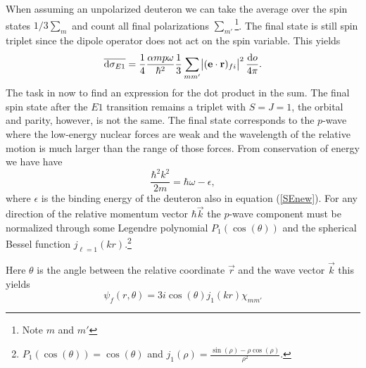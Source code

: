 When assuming an unpolarized deuteron we can take the average over the spin states $1/3 \sum_m$ and count all final polarizations $\sum_{m'}$\footnote{Note $m$ and $m'$}. The final state is still spin triplet since the dipole operator does not act on the spin variable. This yields
\begin{equation} \label{diffcross}
    \overline{\textrm{d}\sigma_{E1}} = \frac{1}{4}\frac{\alpha m p \omega}{\hbar^2} \frac{1}{3} \sum_{mm'}\abs{(\bm{\mathrm{e}}\cdot \bm{\mathrm{r}})_{fi}}^2 \frac{\textrm{d}o}{4\pi}.
\end{equation}
The task in now to find an expression for the dot product in the sum. The final spin state after the $E1$ transition remains a triplet with $S=J=1$, the orbital and parity, however, is not the same. The final state corresponds to the $p$-wave where the low-energy nuclear forces are weak and the wavelength of the relative motion is much larger than the range of those forces. From conservation of energy we have have
\begin{equation}
    \frac{\hbar^2 k^2}{2m} = \hbar\omega - \epsilon,
\end{equation}
where $\epsilon$ is the binding energy of the deuteron also in equation (\ref{SEnew}). For any direction of the relative momentum vector $\hbar \vec{k}$ the $p$-wave component must be normalized through some Legendre polynomial $P_1(\cos(\theta))$ and the spherical Bessel function $j_{\ell=1}(kr)$.\footnote{$P_1(\cos(\theta))=\cos(\theta)$ and $j_1(\rho)=\frac{\sin(\rho)-\rho\cos(\rho)}{\rho^2}.$}

Here $\theta$ is the angle between the relative coordinate $\vec{r}$ and the wave vector $\vec{k}$ this yields
\begin{equation}
    \psi_f(r,\theta) = 3i\cos(\theta)j_1(kr)\chi_{mm'}
\end{equation}

